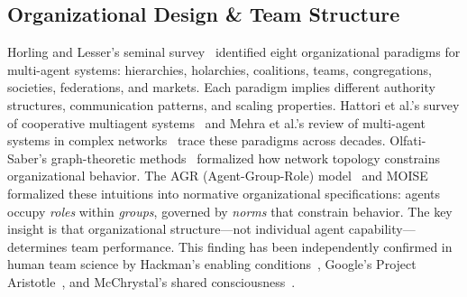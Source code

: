 \documentclass{article}
\begin{document}
\subsection{Organizational Design \& Team Structure}
\label{sec:p-org}

%
%
%
%
%
%

Horling and Lesser's seminal survey~\citep{horling2004survey} identified eight
organizational paradigms for multi-agent systems: hierarchies, holarchies, coalitions,
teams, congregations, societies, federations, and markets. Each paradigm implies
different authority structures, communication patterns, and scaling properties.
Hattori et al.'s survey of cooperative multiagent
systems~\citep{sutra527_cooperative1999} and Mehra et al.'s review of multi-agent
systems in complex networks~\citep{sutra14170_multiagent2020} trace these paradigms
across decades. Olfati-Saber's graph-theoretic
methods~\citep{sutra14017_graph2010} formalized how network topology constrains
organizational behavior. The AGR (Agent-Group-Role) model~\citep{ferber2004agr} and
MOISE~\citep{hubner2002moise} formalized these intuitions into normative
organizational specifications: agents occupy \emph{roles} within \emph{groups},
governed by \emph{norms} that constrain behavior.
The key insight is that organizational structure---not individual agent
capability---determines team performance. This finding has been independently
confirmed in human team science by Hackman's enabling
conditions~\citep{hackman2002leading}, Google's Project
Aristotle~\citep{duhigg2016google}, and McChrystal's shared
consciousness~\citep{mcchrystal2015team}.
\end{document}
